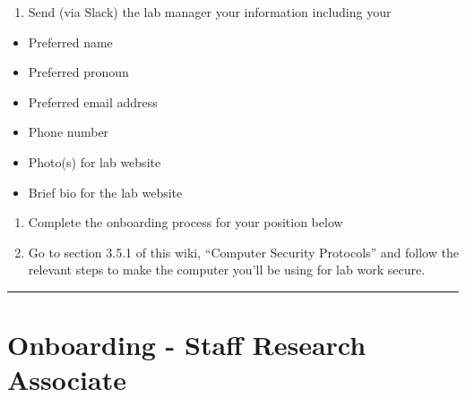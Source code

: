 \documentclass[
]{book}
\providecommand{\tightlist}{%
  \setlength{\itemsep}{0pt}\setlength{\parskip}{0pt}}
\begin{document}
\begin{enumerate}
\def\labelenumi{\arabic{enumi}.}
\setcounter{enumi}{2}
\tightlist
\item
  Send (via Slack) the lab manager your information including your
\end{enumerate}

\begin{itemize}
\tightlist
\item
  Preferred name
\item
  Preferred pronoun
\item
  Preferred email address
\item
  Phone number
\item
  Photo(s) for lab website
\item
  Brief bio for the lab website
\end{itemize}

\begin{enumerate}
\def\labelenumi{\arabic{enumi}.}
\setcounter{enumi}{3}
\item
  Complete the onboarding process for your position below
\item
  Go to section 3.5.1 of this wiki, ``Computer Security Protocols'' and follow the relevant steps to make the computer you'll be using for lab work secure.
\end{enumerate}

\begin{center}\rule{0.5\linewidth}{0.5pt}\end{center}

\hypertarget{onboarding---staff-research-associate}{%
\section{Onboarding - Staff Research Associate}\label{onboarding---staff-research-associate}}
\end{document}
